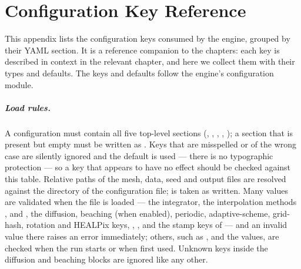 \chapter{Configuration Key Reference}\label{app:config}

This appendix lists the configuration keys consumed by the engine, grouped by their YAML
section. It is a reference companion to the chapters: each key is described in context in
the relevant chapter, and here we collect them with their types and defaults. The keys and
defaults follow the engine's configuration module.

\paragraph{Load rules.} A configuration must contain all five top-level sections
(, , , , ); a section that is
present but empty must be written as \code{\{\}}. Keys that are misspelled or of the wrong
case are silently ignored and the default is used --- there is no typographic protection ---
so a key that appears to have no effect should be checked against this table. Relative paths of the mesh,
data, seed and output files are resolved against the directory of the configuration file;
 is taken as written. Many values are validated when the file is
loaded --- the integrator, the interpolation methods ,  and
, the diffusion, beaching (when enabled), periodic, adaptive-scheme, grid-hash, rotation
and HEALPix keys, , ,  and the stamp keys of
 --- and an invalid value there raises an error immediately; others, such as
,  and the  values, are checked when the run starts or
when first used. Unknown keys inside the diffusion and
beaching blocks are ignored like any other.

\setlength{\tabcolsep}{4pt}

